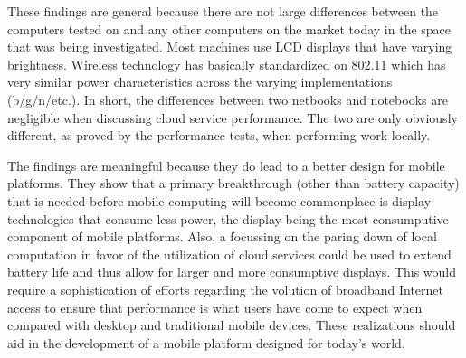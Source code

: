 
These findings are general because there are not large differences between the
computers tested on and any other computers on the market today in the space
that was being investigated.  Most machines use LCD displays that have varying
brightness.  Wireless technology has basically standardized on 802.11 which has
very similar power characteristics across the varying implementations
(b/g/n/etc.).  In short, the differences between two netbooks and notebooks are
negligible when discussing cloud service performance.  The two are only
obviously different, as proved by the performance tests, when performing work
locally.


The findings are meaningful because they do lead to a better design for mobile
platforms.  They show that a primary breakthrough (other than battery capacity)
that is needed before mobile computing will become commonplace is display
technologies that consume less power, the display being the most consumputive
component of mobile platforms.  Also, a focussing on the paring down of local
computation in favor of the utilization of cloud services could be used to
extend battery life and thus allow for larger and more consumptive displays.
This would require a sophistication of efforts regarding the volution of
broadband Internet access to ensure that performance is what users have come to
expect when compared with desktop and traditional mobile devices.  These
realizations should aid in the development of a mobile platform designed for
today's world.

